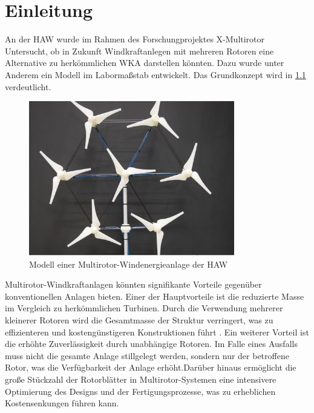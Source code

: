 \chapter{Einleitung}


An der HAW wurde im Rahmen des Forschungprojektes X-Multirotor Untersucht, ob in Zukunft Windkraftanlegen mit mehreren Rotoren eine Alternative zu herkömmlichen WKA darstellen könnten. Dazu wurde unter Anderem ein Modell im Labormaßstab entwickelt. Das Grundkonzept wird in \cref{fig:multirotor} verdeutlicht.

\begin{figure}[htbp] %
    \centering %
    \includegraphics[width=0.8\textwidth]{figures/multirotor.jpg} %
    \caption{Modell einer Multirotor-Windenergieanlage der HAW \cite{fink_multirotorjpg_2018}} %
    \label{fig:multirotor} %
\end{figure}

Multirotor-Windkraftanlagen könnten signifikante Vorteile gegenüber konventionellen Anlagen bieten. Einer der Hauptvorteile ist die reduzierte Masse im Vergleich zu herkömmlichen Turbinen. Durch die Verwendung mehrerer kleinerer Rotoren wird die Gesamtmasse der Struktur verringert, was zu effizienteren und kostengünstigeren Konstruktionen führt \cite{jamieson_multi-rotors_2012}. Ein weiterer Vorteil ist die erhöhte Zuverlässigkeit durch unabhängige Rotoren. Im Falle eines Ausfalls muss nicht die gesamte Anlage stillgelegt werden, sondern nur der betroffene Rotor, was die Verfügbarkeit der Anlage erhöht.Darüber hinaus ermöglicht die große Stückzahl der Rotorblätter in Multirotor-Systemen eine intensivere Optimierung des Designs und der Fertigungsprozesse, was zu erheblichen Kostensenkungen führen kann.

